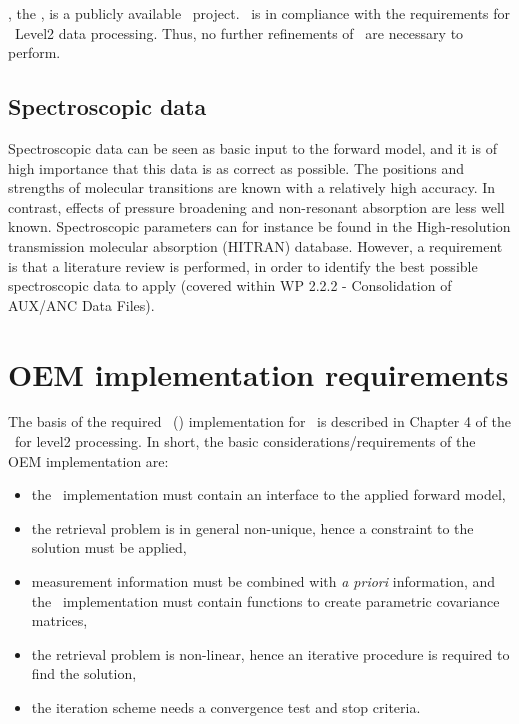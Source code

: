 \ARTS, the \ARTSlong,
is a publicly available \FOSSlong\ project.
\ARTS\ is in compliance with the requirements for \smr\ Level2
data processing. Thus, no further refinements of \ARTS\ are necessary to perform.

\subsection{Spectroscopic data}

Spectroscopic data can be seen as basic input to the forward model,  
and it is of high importance that this data is as correct as possible. 
The positions and strengths of molecular transitions
are known with a relatively high accuracy. In contrast, effects of pressure
broadening and non-resonant absorption are less well known.
Spectroscopic parameters can for instance be found in the 
High-resolution transmission molecular absorption (HITRAN) database.
However, a requirement is that a literature review is performed,
in order to identify the best possible spectroscopic data to apply 
(covered within WP 2.2.2 - Consolidation of AUX/ANC Data Files).

\section{OEM implementation requirements}

The basis of the required \OEM\ (\OEMlong) implementation for \smr\ 
is described in Chapter 4 of the \ATBD\ for level2 processing.
In short, the basic considerations/requirements of the OEM implementation are:
\begin{itemize}
\item the \OEM\ implementation must contain an interface to
      the applied forward model,
\item the retrieval problem is in general non-unique, hence
      a constraint to the solution must be applied,
\item measurement information must be combined with \textit{a priori}
      information, and the \OEM\ implementation must contain functions to 
      create parametric covariance matrices,
\item the retrieval problem is non-linear, hence an iterative
      procedure is required to find the solution,
\item the iteration scheme needs a convergence test and stop 
      criteria.
\end{itemize}

